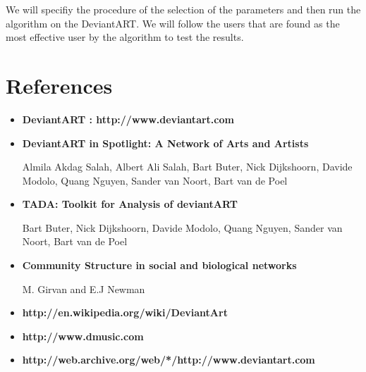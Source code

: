 \documentclass[12pt,a4paper]{report}
\begin{document}
	We will specifiy the procedure of the selection of the parameters and then run the algorithm on the DeviantART.  We will follow the users that are found as the most effective user by the algorithm to test the results. 

\chapter{References}

\begin{itemize}

\item \textbf{DeviantART : http://www.deviantart.com} \\

\item \textbf{DeviantART in Spotlight: A Network of Arts and Artists }

Almila Akdag Salah, Albert Ali Salah, Bart Buter, Nick Dijkshoorn, Davide Modolo, Quang Nguyen, Sander van Noort, Bart van de Poel \\

\item \textbf{TADA: Toolkit for Analysis of deviantART}

Bart Buter, Nick Dijkshoorn, Davide Modolo, Quang Nguyen, Sander van Noort, Bart van de Poel \\

\item \textbf{Community Structure in social and biological networks}

M. Girvan and E.J Newman \\

\item \textbf{http://en.wikipedia.org/wiki/DeviantArt} \\

\item \textbf{http://www.dmusic.com} \\

\item \textbf{http://web.archive.org/web/*/http://www.deviantart.com} \\

\end{itemize}
\end{document}
